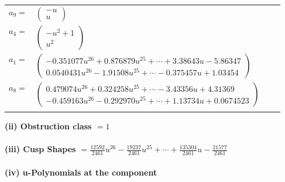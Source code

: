 \documentclass[1p]{elsarticle_modified}
\theoremstyle{definition}
\begin{document}
\begin{tabular}{m{7pt} m{180pt} m{7pt} m{180pt} }
\flushright $a_{9}=$&$\begin{pmatrix}- u\\u\end{pmatrix}$ \\
\flushright $a_{4}=$&$\begin{pmatrix}- u^2+1\\u^2\end{pmatrix}$ \\
\flushright $a_{1}=$&$\begin{pmatrix}-0.351077 u^{26}+0.876879 u^{25}+\cdots+3.38643 u-5.86347\\0.0540431 u^{26}-1.91508 u^{25}+\cdots-0.375457 u+1.03454\end{pmatrix}$ \\
\flushright $a_{8}=$&$\begin{pmatrix}0.479074 u^{26}+0.324258 u^{25}+\cdots-3.43356 u+4.31369\\-0.459163 u^{26}-0.292970 u^{25}+\cdots+1.13734 u+0.0674523\end{pmatrix}$\\&\end{tabular}
\flushleft \textbf{(ii) Obstruction class $= 1$}\\~\\
\flushleft \textbf{(iii) Cusp Shapes $= \frac{12592}{2461} u^{26}-\frac{19237}{2461} u^{25}+\cdots+\frac{135304}{2461} u-\frac{21577}{2461}$}\\~\\
\newpage\renewcommand{\arraystretch}{1}
\flushleft \textbf{(iv) u-Polynomials at the component}\newline \\
\end{document}
